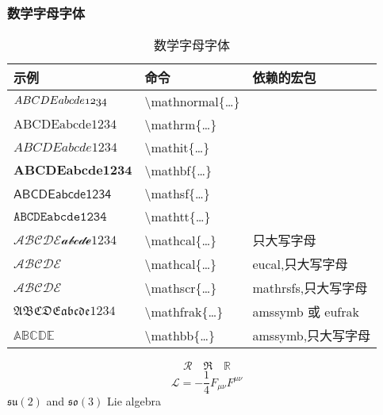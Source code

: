 \documentclass[a4paper]{ctexart}
\begin{document}
    \subsubsection{数学字母字体}
    \begin{table}[H]
        \centering
        \caption{数学字母字体}
        \begin{tabular}{lll}
            \toprule
            示例 &命令 &依赖的宏包\\
            \midrule
            $\mathnormal{ABCDEabcde1234}$   & \textbackslash mathnormal\{\ldots\}   &                     \\
            $\mathrm{ABCDEabcde1234}$       & \textbackslash mathrm\{\ldots\}       &                     \\
            $\mathit{ABCDEabcde1234}$       & \textbackslash mathit\{\ldots\}       &                     \\
            $\mathbf{ABCDEabcde1234}$       & \textbackslash mathbf\{\ldots\}       &                     \\
            $\mathsf{ABCDEabcde1234}$       & \textbackslash mathsf\{\ldots\}       &                     \\
            $\mathtt{ABCDEabcde1234}$       & \textbackslash mathtt\{\ldots\}       &                     \\
            $\mathcal{ABCDEabcde1234}$      & \textbackslash mathcal\{\ldots\}      & 只大写字母            \\
            \midrule
            $\mathcal{ABCDE}$               & \textbackslash mathcal\{\ldots\}      & eucal,只大写字母      \\
            $\mathscr{ABCDE}$               & \textbackslash mathscr\{\ldots\}      & mathrsfs,只大写字母   \\
            $\mathfrak{ABCDEabcde1234}$     & \textbackslash mathfrak\{\ldots\}     & amssymb 或 eufrak    \\
            $\mathbb{ABCDE}$                & \textbackslash mathbb\{\ldots\}       & amssymb,只大写字母    \\
            \bottomrule
        \end{tabular}
    \end{table}
    \[ \mathcal{R} \quad \mathfrak{R \quad \mathbb{R}} \]
    \[ \mathcal{L} = -\frac{1}{4}F_{\mu\nu}F^{\mu\nu} \]
    $\mathfrak{su}(2)$ and $\mathfrak{so}(3)$ Lie algebra
\end{document}
